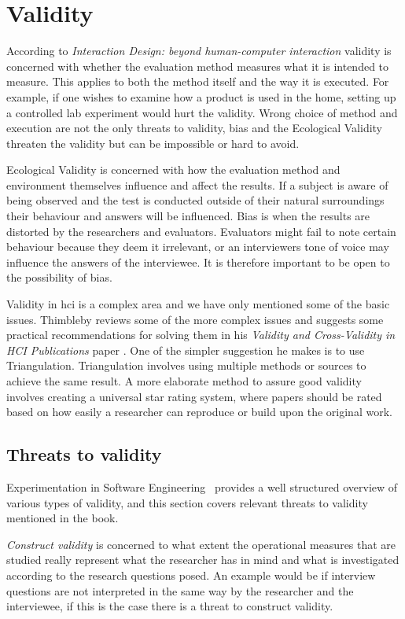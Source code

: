 \section{Validity}
According to \textit{Interaction Design: beyond human-computer interaction} validity is concerned with whether the evaluation method measures what it is intended to measure. This applies to both the method itself and the way it is executed. For example, if one wishes to examine how a product is used in the home, setting up a controlled lab experiment would hurt the validity. Wrong choice of method and execution are not the only threats to validity, bias and the Ecological Validity threaten the validity but can be impossible or hard to avoid.

Ecological Validity is concerned with how the evaluation method and environment themselves influence and affect the results. If a subject is aware of being observed and the test is conducted outside of their natural surroundings their behaviour and answers will be influenced. Bias is when the results are distorted by the researchers and evaluators. Evaluators might fail to note certain behaviour because they deem it irrelevant, or an interviewers tone of voice may influence the answers of the interviewee. It is therefore important to be open to the possibility of bias.

Validity in \gls{hci} is a complex area and we have only mentioned some of the basic issues. Thimbleby reviews some of the more complex issues and suggests some practical recommendations for solving them in his \textit{Validity and Cross-Validity in HCI Publications} paper \cite{validation}. One of the simpler suggestion he makes is to use Triangulation. Triangulation involves using multiple methods or sources to achieve the same result. A more elaborate method to assure good validity involves creating a universal star rating system, where papers should be rated based on how easily a researcher can reproduce or build upon the original work.

\subsection{Threats to validity}
\label{subsec:threatsValidity}
Experimentation in Software Engineering~\cite{experiment} provides a well structured overview of various types of validity, and this section covers relevant threats to validity mentioned in the book.

\textit{Construct validity} is concerned to what extent the operational measures that are studied really represent what the researcher has in mind and what is investigated according to the research questions posed. An example would be if interview questions are not interpreted in the same way by the researcher and the interviewee, if this is the case there is a threat to construct validity.

